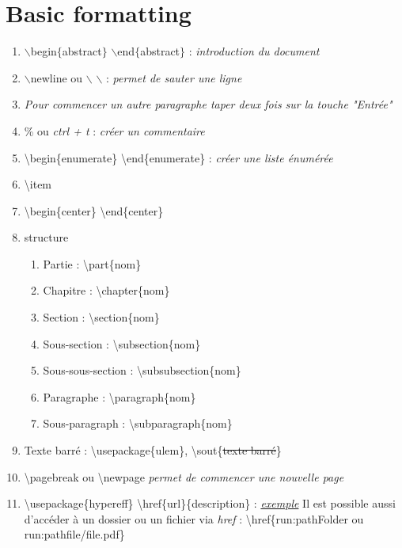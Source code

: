 \documentclass[12pt, letterpaper]{article}
\begin{document}
\section{Basic formatting}
\begin{enumerate}
\item $\backslash$begin$\lbrace$abstract$\rbrace$  $\backslash$end$\lbrace$abstract$\rbrace$ : \textit{introduction du document}
\item $\backslash$newline ou $\backslash$ $\backslash$ : \textit{permet de sauter une ligne}
\item \textit{Pour commencer un autre paragraphe taper deux fois sur la touche "Entrée"}
\item \% ou \textit{ctrl + t} : \textit{créer un commentaire}
\item \textbackslash begin\{enumerate\} \textbackslash end\{enumerate\} : \textit{créer une liste énumérée}
\item \textbackslash item
\item \textbackslash begin\{center\} \textbackslash end\{center\}
\item structure
\begin{enumerate}
\item Partie : \textbackslash part\{nom\}
\item Chapitre : \textbackslash chapter\{nom\}
\item Section : \textbackslash section\{nom\}
\item Sous-section : \textbackslash subsection\{nom\}
\item Sous-sous-section : \textbackslash subsubsection\{nom\}
\item Paragraphe : \textbackslash paragraph\{nom\}
\item Sous-paragraph : \textbackslash subparagraph\{nom\}
\end{enumerate}
\item Texte barré : \textbackslash usepackage\{ulem\}, \textbackslash sout\{\sout{texte barré}\}
\item \textbackslash pagebreak ou \textbackslash newpage \textit{permet de commencer une nouvelle page}
\item \textbackslash usepackage\{hypereff\} \textbackslash href\{url\}\{description\} : \textit{\href{https://en.wikibooks.org/wiki/LaTeX/Hyperlinks}{exemple}}
\newline Il est possible aussi d'accéder à un dossier ou un fichier via \textit{href} :
\newline \textbackslash href\{run:pathFolder ou run:pathfile/file.pdf\}

\end{enumerate}
\end{document}
